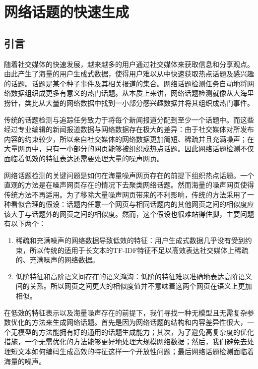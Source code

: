 \chapter{网络话题的快速生成}\label{chap:topicGeneration}
\section{引言}

随着社交媒体的快速发展，越来越多的用户通过社交媒体来获取信息和分享观点。由此产生了海量的用户生成式数据\citep{pang-2013-unsupervised}，使得用户难以从中快速获取热点话题及感兴趣的话题\citep{shahaf2010connecting}。话题是某个种子事件及其相关报道的集合。网络话题检测任务\citep{pang-2013-unsupervised, zhang2013cross}自动地将网络数据组织成更多有意义的热门话题。从本质上来讲，网络话题检测就像从大海里捞针，类比从大量的网络数据中找到一小部分感兴趣数据并将其组织成热门事件\citep{pang-2013-unsupervised}。

传统的话题检测与追踪任务\citep{allan-1998-TDT}致力于将每个新闻报道分配到至少一个话题中\citep{Allan2002Topic}。而这些经过专业编辑的新闻报道数据与网络数据存在极大的差异：由于社交媒体对所发布内容的约束较少，所以来自社交媒体的网络数据更加简短、稀疏并且充满噪声\citep{wxzhao2011comparing}；在大量网页中，只有一小部分的网页能够被组织成热点话题\citep{pang-2013-unsupervised}。因此网络话题检测不仅面临着低效的特征表达还需要处理大量的噪声网页。

网络话题检测的关键问题是如何在海量噪声网页存在的前提下组织热点话题。一个直观的方法是在噪声网页存在的情况下去聚类网络话题。然而海量的噪声网页使得传统方法\citep{bojchevski2017RSC,maurus2016skinny,li2007noise}不再适用。为了移除大量噪声网页带来的不利影响，传统的方法\citep{pang-2013-unsupervised,zhang2013cross}采用了一种看似合理的假设：话题内任意一个网页与相同话题内的其他网页之间的相似度应该大于与话题外的网页之间的相似度。然而，这个假设也很难站得住脚，主要问题有以下两个：
\begin{enumerate}
\renewcommand{\labelenumi}{\theenumi)}
    \item 稀疏和充满噪声的网络数据导致低效的特征：用户生成式数据几乎没有受到约束，所以传统的适用于长文本的TF-IDF特征不足以高效表达社交媒体上稀疏的、充满噪声的网络数据。
    \item 低阶特征和高阶语义间存在的语义鸿沟：低阶的特征难以准确地表达高阶语义间的关系。所以网页之间更大的相似度值并不意味着这两个网页在语义上更加相似。
\end{enumerate}

在低效的特征表示以及海量噪声存在的前提下，我们寻找一种无模型且无需复杂参数优化的方法来生成网络话题。首先是因为网络话题的结构和内容差异性很大，一个无模型的方法能拥有好的通用的话题生成能力；其次，为了避免高复杂度的优化措施，一个无需优化的方法能够更好地处理大规模网络数据\citep{pang-tao-2016-lpd}；然后，我们避免去处理短文本如何编码生成高效的特征这样一个开放性问题\citep{liu2009topic}；最后网络话题检测面临着海量的噪声。

